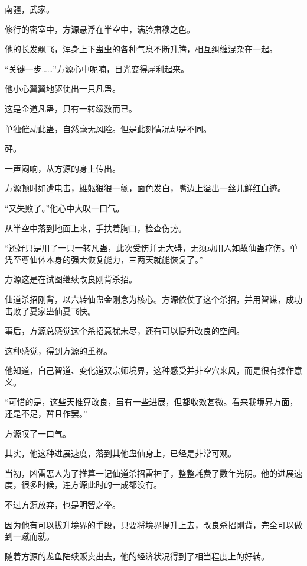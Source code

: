 
\begin{this_body}



南疆，武家。

修行的密室中，方源悬浮在半空中，满脸肃穆之色。

他的长发飘飞，浑身上下蛊虫的各种气息不断升腾，相互纠缠混杂在一起。

“关键一步……”方源心中呢喃，目光变得犀利起来。

他小心翼翼地驱使出一只凡蛊。

这是金道凡蛊，只有一转级数而已。

单独催动此蛊，自然毫无风险。但是此刻情况却是不同。

砰。

一声闷响，从方源的身上传出。

方源顿时如遭电击，雄躯狠狠一颤，面色发白，嘴边上溢出一丝儿鲜红血迹。

“又失败了。”他心中大叹一口气。

从半空中落到地面上来，手扶着胸口，检查伤势。

“还好只是用了一只一转凡蛊，此次受伤并无大碍，无须动用人如故仙蛊疗伤。单凭至尊仙体本身的强大恢复能力，三两天就能恢复了。”

方源这是在试图继续改良刚背杀招。

仙道杀招刚背，以六转仙蛊金刚念为核心。方源依仗了这个杀招，并用智谋，成功击败了夏家蛊仙夏飞快。

事后，方源总感觉这个杀招意犹未尽，还有可以提升改良的空间。

这种感觉，得到方源的重视。

他知道，自己智道、变化道双宗师境界，这种感受并非空穴来风，而是很有操作意义。

“可惜的是，这些天推算改良，虽有一些进展，但都收效甚微。看来我境界方面，还是不足，暂且作罢。”

方源叹了一口气。

其实，他这种进展速度，落到其他蛊仙身上，已经是非常可观。

当初，凶雷恶人为了推算一记仙道杀招雷神子，整整耗费了数年光阴。他的进展速度，很多时候，连方源此时的一成都没有。

不过方源放弃，也是明智之举。

因为他有可以拔升境界的手段，只要将境界提升上去，改良杀招刚背，完全可以做到一蹴而就。

随着方源的龙鱼陆续贩卖出去，他的经济状况得到了相当程度上的好转。


\end{this_body}
